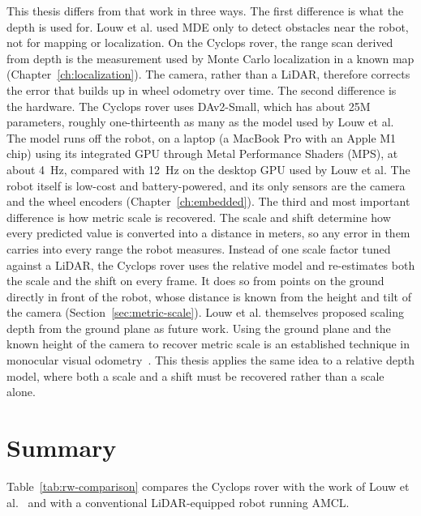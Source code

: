 This thesis differs from that work in three ways.
The first difference is what the depth is used for.
Louw et al. used MDE only to detect obstacles near the robot, not for mapping or localization.
On the Cyclops rover, the range scan derived from depth is the measurement used by Monte Carlo localization in a known map (Chapter~\ref{ch:localization}).
The camera, rather than a LiDAR, therefore corrects the error that builds up in wheel odometry over time.
The second difference is the hardware.
The Cyclops rover uses DAv2-Small, which has about 25M parameters, roughly one-thirteenth as many as the model used by Louw et al.
The model runs off the robot, on a laptop (a MacBook Pro with an Apple M1 chip) using its integrated GPU through Metal Performance Shaders (MPS), at about 4~Hz, compared with 12~Hz on the desktop GPU used by Louw et al.
The robot itself is low-cost and battery-powered, and its only sensors are the camera and the wheel encoders (Chapter~\ref{ch:embedded}).
The third and most important difference is how metric scale is recovered.
The scale and shift determine how every predicted value is converted into a distance in meters, so any error in them carries into every range the robot measures.
Instead of one scale factor tuned against a LiDAR, the Cyclops rover uses the relative model and re-estimates both the scale and the shift on every frame.
It does so from points on the ground directly in front of the robot, whose distance is known from the height and tilt of the camera (Section~\ref{sec:metric-scale}).
Louw et al. themselves proposed scaling depth from the ground plane as future work.
Using the ground plane and the known height of the camera to recover metric scale is an established technique in monocular visual odometry~\cite{Kitt2011PlanarRoad}.
This thesis applies the same idea to a relative depth model, where both a scale and a shift must be recovered rather than a scale alone.

\section{Summary}
\label{sec:rw-summary}

Table~\ref{tab:rw-comparison} compares the Cyclops rover with the work of Louw et
al.~\cite{practical} and with a conventional LiDAR-equipped robot running AMCL.

